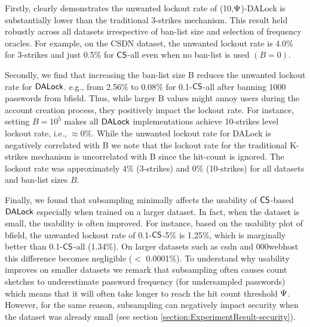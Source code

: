 \vspace{-0.05cm}
 Firstly,  clearly demonstrates the unwanted lockout rate of (10,$\Psi$)-DALock is substantially lower than the traditional 3-strikes mechanism. This result held robustly across all datasets irrespective of ban-list size and selection of frequency oracles. For example, on the CSDN dataset, the unwanted lockout rate is 4.0\% for  3-strikes and just 0.5\% for $\mathsf{CS}$-all even when no ban-list is used $(B=0)$.

Secondly, we find that increasing the ban-list size B reduces the unwanted lockout rate for $\mathsf{DALock}$. e.g., from 2.56\% to 0.08\% for 0.1-$\mathsf{CS}$-all after banning 1000 passwords from bfield. Thus, while larger B values might annoy users during the account creation process, they positively impact the lockout rate. For instance, setting $B=10^5$ makes all $\mathsf{DALock}$ implementations achieve 10-strikes level lockout rate, i.e., $\approx 0\%$. While the unwanted lockout rate for DALock is negatively correlated with B we note that the lockout rate for the traditional K-strikes mechanism is uncorrelated with B since the hit-count is ignored. The lockout rate was approximately 4\% (3-strikes) and 0\% (10-strikes) for all datasets and ban-list sizes $B$. %


Finally, we found that subsampling minimally affects the usability of $\mathsf{CS}$-based $\mathsf{DALock}$ especially when trained on a larger dataset. In fact, when the dataset is small, the usability is often improved. For instance, based on the usability plot of bfield, the unwanted lockout rate of 0.1-$\mathsf{CS}$-5\% is 1.25\%, which is marginally better than 0.1-$\mathsf{CS}$-all (1.34\%). On larger datasets such as csdn and 000webhost this difference becomes negligible ($<$ 0.0001\%). 
To understand why usability improves on smaller datasets we remark that subsampling often causes count sketches to underestimate password frequency (for undersampled passwords) which means that it will often take longer to reach the hit count threshold $\Psi$. However, for the same reason, subsampling can negatively impact security when the dataset was already small (see section \ref{section:ExperimentResult-security}). 







